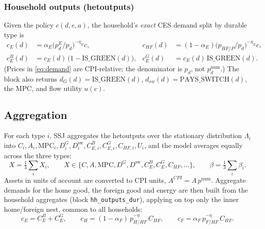 \documentclass[11pt,a4paper]{article}
\newcommand{\num}{\mathrm{num}}
\newcommand{\dsw}{D^{\mathrm{sw}}}
\newcommand{\DG}{D^{G}}
\newcommand{\pE}{p^{E}}
\begin{document}
\subsubsection{Household outputs (hetoutputs)}\label{sec:hetout}

Given the policy $c(d,e,a)$, the household's \emph{exact} CES demand split by
durable type is
\begin{align}
c_E(d) &= \alpha_E\bigl(\pE_d/p_d\bigr)^{-\eta_E} c, &
c_{HF}(d) &= (1-\alpha_E)\bigl(p_{HF/P}/p_d\bigr)^{-\eta_E} c, \label{eq:demand}\\
c_E^{B}(d) &= c_E(d)\,\bigl(1-\mathrm{IS\_GREEN}(d)\bigr), &
c_E^{G}(d) &= c_E(d)\,\mathrm{IS\_GREEN}(d).
\end{align}
(Prices in \eqref{eq:demand} are CPI-relative; the denominator is $p_d$, not
$p_d^{\num}$.) The block also returns $d_G(d)=\mathrm{IS\_GREEN}(d)$,
$d_{sw}(d)=\mathrm{PAYS\_SWITCH}(d)$, the MPC, and flow utility $u(c)$.

\subsection{Aggregation}\label{sec:agg}

For each type $i$, SSJ aggregates the hetoutputs over the stationary
distribution $\Lambda_i$ into $C_i,A_i,\mathrm{MPC}_i,\DG_i,\dsw_i,
C^{B}_{E,i},C^{G}_{E,i},C_{HF,i},U_i$, and the model averages equally across the
three types:
\begin{equation}
X=\tfrac13\textstyle\sum_i X_i,\qquad
X\in\{C,A,\mathrm{MPC},\DG,\dsw,C^{B}_{E},C^{G}_{E},C_{HF},\ldots\},
\qquad \beta=\tfrac13\textstyle\sum_i\beta_i .
\end{equation}
Assets in units of account are converted to CPI units, $A^{CPI}=A\,p^{\num}$.
Aggregate demands for the home good, the foreign good and energy are then built
from the household aggregates (block \texttt{hh\_outputs\_dur}), applying on top
only the inner home/foreign nest, common to all households:
\begin{equation}
c_E = C^{B}_{E}+C^{G}_{E},\qquad
c_H = (1-\alpha_F)\,p_{H/HF}^{-\eta}\,C_{HF},\qquad
c_F = \alpha_F\,p_{F/HF}^{-\eta}\,C_{HF}. \label{eq:cHcF}
\end{equation}
\end{document}
